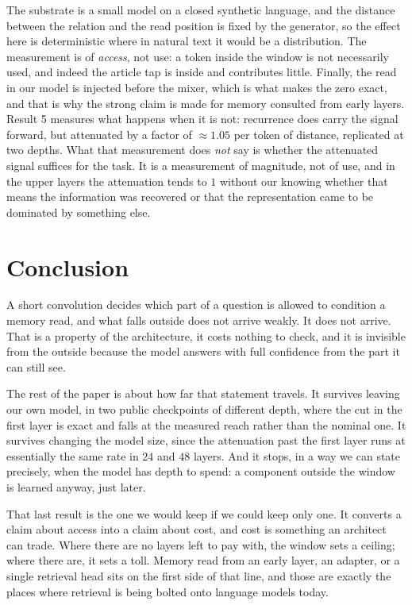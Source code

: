 \documentclass[11pt,a4paper]{article}
\begin{document}
The substrate is a small model on a closed synthetic language, and the distance between the relation
and the read position is fixed by the generator, so the effect here is deterministic where in natural
text it would be a distribution. The measurement is of \emph{access}, not use: a token inside the window
is not necessarily used, and indeed the article tap is inside and contributes little. Finally, the read
in our model is injected before the mixer, which is what makes the zero exact, and that is why the
strong claim is made for memory consulted from early layers. Result 5 measures what happens when it is
not: recurrence does carry the signal forward, but attenuated by a factor of $\approx 1.05$ per token
of distance, replicated at two depths. What that measurement does \emph{not} say is whether the
attenuated signal suffices for the task. It is a measurement of magnitude, not of use, and in the
upper layers the attenuation tends to $1$ without our knowing whether that means the information was
recovered or that the representation came to be dominated by something else.

\section{Conclusion}

A short convolution decides which part of a question is allowed to condition a memory read, and what
falls outside does not arrive weakly. It does not arrive. That is a property of the architecture, it
costs nothing to check, and it is invisible from the outside because the model answers with full
confidence from the part it can still see.

The rest of the paper is about how far that statement travels. It survives leaving our own model, in
two public checkpoints of different depth, where the cut in the first layer is exact and falls at the
measured reach rather than the nominal one. It survives changing the model size, since the attenuation
past the first layer runs at essentially the same rate in $24$ and $48$ layers. And it stops, in a way
we can state precisely, when the model has depth to spend: a component outside the window is learned
anyway, just later.

That last result is the one we would keep if we could keep only one. It converts a claim about access
into a claim about cost, and cost is something an architect can trade. Where there are no layers left
to pay with, the window sets a ceiling; where there are, it sets a toll. Memory read from an early
layer, an adapter, or a single retrieval head sits on the first side of that line, and those are
exactly the places where retrieval is being bolted onto language models today.
\end{document}
